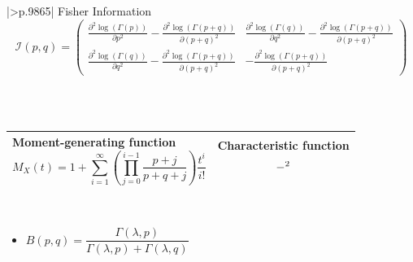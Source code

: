 \documentclass{article}
\begin{document}
	\vspace{-24pt}
	\begin{center}
		\begin{tabular}{|*1{>{\centering\arraybackslash}p{}|}}
			\hline
			Fisher Information
			\[ \mathcal{I} \left ( p,q \right ) =  
			\begin{pmatrix}
				\frac{\partial^{2}\log\left ( \Gamma\left ( p \right ) \right )}{\partial p^{2}} - \frac{\partial^{2}\log\left ( \Gamma\left ( p+q \right ) \right )}{\partial \left ( p+q \right )^{2}} & \frac{\partial^{2}\log\left ( \Gamma\left ( q \right ) \right )}{\partial q^{2}} - \frac{\partial^{2}\log\left ( \Gamma\left ( p+q \right ) \right )}{\partial \left ( p+q \right )^{2}}\\ 
				\frac{\partial^{2}\log\left ( \Gamma\left ( q \right ) \right )}{\partial q^{2}} - \frac{\partial^{2}\log\left ( \Gamma\left ( p+q \right ) \right )}{\partial \left ( p+q \right )^{2}} & 
				-\frac{\partial^{2}\log\left ( \Gamma\left ( p+q \right ) \right )}{\partial \left ( p+q \right )^{2}}
			\end{pmatrix} \]
			\\
		\end{tabular} \\
	\end{center}
	
	\vspace{-22.5pt}
	\begin{center}
		\begin{tabular}{|*2{>{\centering\arraybackslash}p{.48\textwidth}|}}
			\hline
			Moment-generating function
			\[ M_{X}\left( t\right) = 1+\sum_{i=1}^{\infty}\left ( \prod_{j=0}^{i-1}\frac{p+j}{p+q+j} \right )\frac{t^{i}}{i!} \]
			& Characteristic function
			\[- \footnotemark[2] \]
			\\
			\hline
		\end{tabular} \\
	\end{center}
	
	\begin{itemize}
		\item $B\left( p,q\right) = \dfrac{\Gamma\left( \lambda, p \right) }{\Gamma\left( \lambda,p\right) + \Gamma\left( \lambda,q\right) }$
	\end{itemize}
	
	
	\newpage
	
\end{document}
